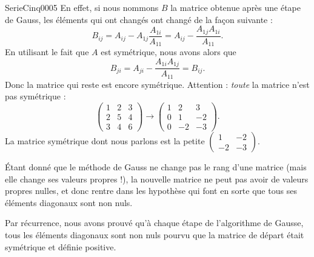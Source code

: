 \begin{corrige}{SerieCinq0005}
	En effet, si nous nommons $B$ la matrice obtenue après une étape de Gauss, les éléments qui ont changés ont changé de la façon suivante :
	\begin{equation}
		B_{ij}=A_{ij}-A_{1j}\frac{ A_{1i} }{ A_{11} }=A_{ij}-\frac{ A_{1j}A_{1i} }{ A_{11} }.
	\end{equation}
	En utilisant le fait que $A$ est symétrique, nous avons alors que
	\begin{equation}
		B_{ji}=A_{ji}-\frac{ A_{1i}A_{1j} }{ A_{11} }=B_{ij}.
	\end{equation}
	Donc la matrice qui reste est encore symétrique. Attention : \emph{toute} la matrice n'est pas symétrique :
	\begin{equation}
		\begin{pmatrix}
			1	&	2	&	3	\\
			2	&	5	&	4	\\
			3	&	4	&	6
		\end{pmatrix}
		\to
		\begin{pmatrix}
			1	&	2	&	3	\\
			0	&	1	&	-2	\\
			0	&	-2	&	-3
		\end{pmatrix}.
	\end{equation}
	La matrice symétrique dont nous parlons est la petite $\begin{pmatrix}
		1	&	-2	\\ 
		-2	&	-3	
	\end{pmatrix}$.

	Étant donné que le méthode de Gauss ne change pas le rang d'une matrice (mais elle change ses valeurs propres !), la nouvelle matrice ne peut pas avoir de valeurs propres nulles, et donc rentre dans les hypothèse qui font en sorte que tous ses éléments diagonaux sont non nuls.

	Par récurrence, nous avons prouvé qu'à chaque étape de l'algorithme de Gausse, tous les éléments diagonaux sont non nuls pourvu que la matrice de départ était symétrique et définie positive.

\end{corrige}

